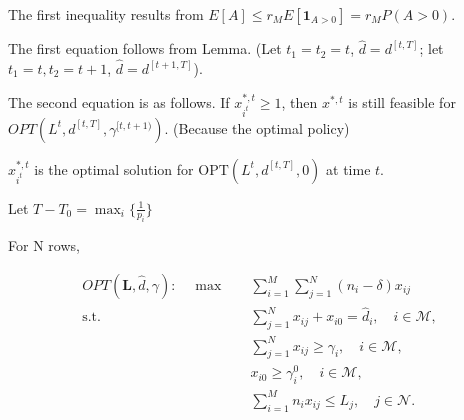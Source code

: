 The first inequality results from $E[A] \leq r_{M} E[\bm{1}_{A>0}] = r_{M} P(A>0)$.

The first equation follows from Lemma. (Let $t_1 = t_2 = t$, $\hat{d} = d^{[t, T]}$; let $t_1 = t, t_2 = t+1$, $\hat{d} = d^{[t+1, T]}$).

The second equation is as follows. If $x_{i^{t}}^{*,t} \geq 1$, then $x^{*,t}$ is still feasible for $OPT(L^{t}, d^{[t, T]}, \gamma^{[t,t+1)})$. (Because the optimal policy)

$x_{i^{t}}^{*,t}$ is the optimal solution for $\text{OPT}(L^{t}, d^{[t, T]}, 0)$ at time $t$.

Let $T- T_{0} = \max_{i}\{\frac{1}{p_{i}}\}$


For N rows,

\begin{align*}
    OPT(\bm{L}, \hat{d}, \gamma): \quad \max \quad & \sum_{i = 1}^{M} \sum_{j = 1}^{N} (n_i - \delta) x_{ij} \\
    \text {s.t.} \quad & \sum_{j=1}^{N} x_{ij} + x_{i0} = \hat{d}_{i}, \quad i \in \mathcal{M},  \\ 
    & \sum_{j=1}^{N} x_{ij} \geq \gamma_{i}, \quad i \in \mathcal{M}, \\
    & x_{i0} \geq \gamma_{i}^{0}, \quad i \in \mathcal{M}, \\
    & \sum_{i=1}^{M} n_{i} x_{ij} \leq L_{j}, \quad j \in \mathcal{N}.
\end{align*}

